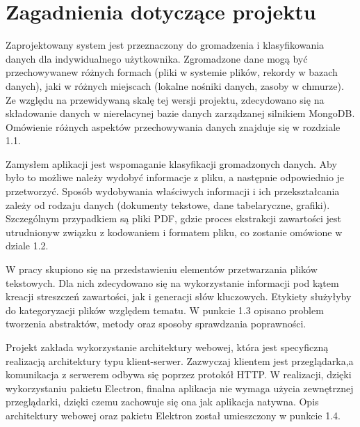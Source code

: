 \documentclass[12pt,a4paper,twoside]{article}
\begin{document}
\section{Zagadnienia dotyczące projektu}
Zaprojektowany system jest przeznaczony do gromadzenia i klasyfikowania danych dla indywidualnego użytkownika. Zgromadzone dane mogą być przechowywane\break w różnych formach (pliki w systemie plików, rekordy w bazach danych), jak\break i w różnych miejscach (lokalne nośniki danych, zasoby w chmurze). Ze względu na przewidywaną skalę tej wersji projektu, zdecydowano się na składowanie danych w nierelacynej bazie danych zarządzanej silnikiem MongoDB. Omówienie różnych aspektów przechowywania danych znajduje się w rozdziale 1.1.\par
Zamysłem aplikacji jest wspomaganie klasyfikacji gromadzonych danych. Aby było to możliwe należy wydobyć informacje z pliku, a następnie odpowiednio je przetworzyć. Sposób wydobywania właściwych informacji i ich przekształcania zależy od rodzaju danych (dokumenty tekstowe, dane tabelaryczne, grafiki).
Szczególnym przypadkiem są pliki PDF, gdzie proces ekstrakcji zawartości jest utrudniony\break w związku z kodowaniem i formatem pliku, co zostanie omówione w dziale 1.2. \par
W pracy skupiono się na przedstawieniu elementów przetwarzania plików tekstowych. Dla nich zdecydowano się na wykorzystanie informacji pod kątem kreacji streszczeń zawartości, jak i generacji słów kluczowych. Etykiety służyłyby do kategoryzacji plików względem tematu. W punkcie 1.3 opisano problem tworzenia abstraktów, metody oraz sposoby sprawdzania poprawności.\par
Projekt zakłada wykorzystanie architektury webowej, która jest specyficzną realizacją architektury typu klient-serwer. Zazwyczaj klientem jest przeglądarka,\break a komunikacja z serwerem odbywa się poprzez protokół HTTP.
W realizacji, dzięki wykorzystaniu pakietu Electron, finalna aplikacja nie wymaga użycia zewnętrznej przeglądarki, dzięki czemu zachowuje się ona jak aplikacja natywna. Opis architektury webowej oraz pakietu Elektron został umieszczony w punkcie 1.4. 
\clearpage
\end{document}
